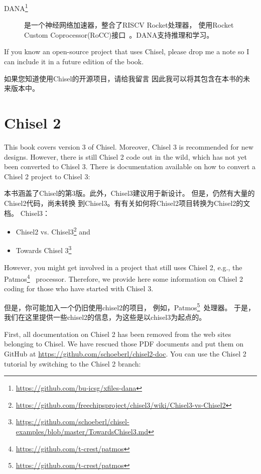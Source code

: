 \documentclass[%
    10pt,
    headinclude, footexclude,
    openright, %
    notitlepage,
    cleardoubleempty,
    headsepline,
    pointlessnumbers,
    bibtotoc, idxtotoc,
    ]{scrbook}
\newcommand{\myref}[2]{\href{#1}{#2}}
\renewcommand{\myref}[2]{{#2}{\footnote{\url{#1}}}}
\begin{document}
{{\begin{description}
\item[\myref{https://github.com/bu-icsg/xfiles-dana}{DANA}] 是一个神经网络加速器，整合了RISCV Rocket处理器，
使用Rocket Custom Coprocessor(RoCC)接口~\cite{RoCC:2015}。DANA支持推理和学习。

\end{description}

If you know an open-source project that uses Chisel, please drop me a note
so I can include it in a future edition of the book.


如果您知道使用Chisel的开源项目，请给我留言
因此我可以将其包含在本书的未来版本中。

\chapter{Chisel 2}

This book covers version 3 of Chisel. Moreover, Chisel 3 is recommended for new designs.
However, there is still Chisel 2 code out in the wild, which has not yet been converted
to Chisel 3. There is documentation available on how to convert a Chisel 2 project to
Chisel 3:


本书涵盖了Chisel的第3版。此外，Chisel3建议用于新设计。
但是，仍然有大量的Chisel2代码，尚未转换
到Chisel3。有有关如何将Chisel2项目转换为Chisel2的文档。
Chisel3：

\begin{itemize}
\item \myref{https://github.com/freechipsproject/chisel3/wiki/Chisel3-vs-Chisel2}{Chisel2 vs. Chisel3} and
\item \myref{https://github.com/schoeberl/chisel-examples/blob/master/TowardsChisel3.md}{Towards Chisel 3}
\end{itemize}

However, you might get involved in a project that still uses Chisel 2,
e.g., the \myref{https://github.com/t-crest/patmos}{Patmos}~\cite{patmos:rts2018} processor.
Therefore, we provide here some information on Chisel 2 coding for those who
have started with Chisel 3.

但是，你可能加入一个仍旧使用chisel2的项目，
例如，\myref{https://github.com/t-crest/patmos}{Patmos}~\cite{patmos:rts2018}处理器。
于是，我们在这里提供一些chisel2的信息，为这些是以chisel3为起点的。

First, all documentation on Chisel 2 has been removed from the web sites
belonging to Chisel. We have rescued those PDF documents and put them
on GitHub at \url{https://github.com/schoeberl/chisel2-doc}.
You can use the Chisel 2 tutorial by switching to the Chisel 2 branch:

}}
\end{document}
